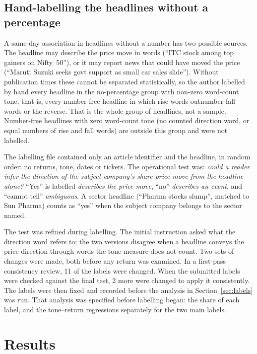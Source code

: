 \documentclass[11pt]{article}
\begin{document}
\subsection{Hand-labelling the headlines without a percentage}

A same-day association in headlines without a number has two possible sources. The headline may describe the price move in words (``ITC stock among top gainers on Nifty~50''), or it may report news that could have moved the price (``Maruti Suzuki seeks govt support as small car sales slide''). Without publication times these cannot be separated statistically, so the author labelled by hand every headline in the no-percentage group with non-zero word-count tone, that is, every number-free headline in which rise words outnumber fall words or the reverse. That is the whole group of \nLabelled{} headlines, not a sample. Number-free headlines with zero word-count tone (no counted direction word, or equal numbers of rise and fall words) are outside this group and were not labelled.

The labelling file contained only an article identifier and the headline, in random order: no returns, tone, dates or tickers. The operational test was: \emph{could a reader infer the direction of the subject company's share price move from the headline alone?} ``Yes'' is labelled \emph{describes the price move}, ``no'' \emph{describes an event}, and ``cannot tell'' \emph{ambiguous}. A sector headline (``Pharma stocks slump'', matched to Sun Pharma) counts as ``yes'' when the subject company belongs to the sector named.

The test was refined during labelling. The initial instruction asked what the direction word refers to; the two versions disagree when a headline conveys the price direction through words the tone measure does not count. Two sets of changes were made, both before any return was examined. In a first-pass consistency review, 11 of the \nLabelled{} labels were changed. When the submitted labels were checked against the final test, 2 more were changed to apply it consistently. The labels were then fixed and recorded before the analysis in Section~\ref{sec:labels} was run. That analysis was specified before labelling began: the share of each label, and the tone--return regressions separately for the two main labels.

\section{Results}
\end{document}
